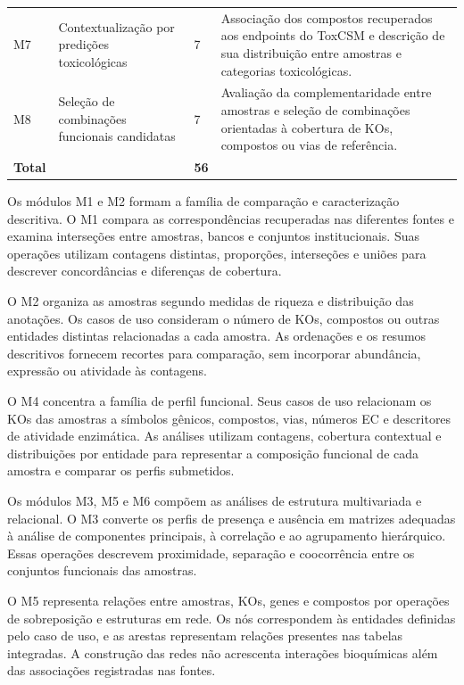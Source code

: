 \begin{table}[htbp]
\begin{tabularx}{\textwidth}{
    @{}
    p{0.75cm}
    p{4.7cm}
    p{0.9cm}
    X
    @{}
}
M7
& Contextualização por predições toxicológicas
& 7
& Associação dos compostos recuperados aos endpoints do ToxCSM e descrição de
sua distribuição entre amostras e categorias toxicológicas. \\

M8
& Seleção de combinações funcionais candidatas
& 7
& Avaliação da complementaridade entre amostras e seleção de combinações
orientadas à cobertura de KOs, compostos ou vias de referência. \\

\midrule
\textbf{Total}
&
& \textbf{56}
& \\

\bottomrule
\end{tabularx}
\end{table}

Os módulos M1 e M2 formam a família de comparação e caracterização
descritiva. O M1 compara as correspondências recuperadas nas diferentes
fontes e examina interseções entre amostras, bancos e conjuntos
institucionais. Suas operações utilizam contagens distintas, proporções,
interseções e uniões para descrever concordâncias e diferenças de cobertura.

O M2 organiza as amostras segundo medidas de riqueza e distribuição das
anotações. Os casos de uso consideram o número de KOs, compostos ou outras
entidades distintas relacionadas a cada amostra. As ordenações e os resumos
descritivos fornecem recortes para comparação, sem incorporar abundância,
expressão ou atividade às contagens.

O M4 concentra a família de perfil funcional. Seus casos de uso relacionam os
KOs das amostras a símbolos gênicos, compostos, vias, números EC e descritores
de atividade enzimática. As análises utilizam contagens, cobertura contextual
e distribuições por entidade para representar a composição funcional de cada
amostra e comparar os perfis submetidos.

Os módulos M3, M5 e M6 compõem as análises de estrutura multivariada e
relacional. O M3 converte os perfis de presença e ausência em matrizes
adequadas à análise de componentes principais, à correlação e ao agrupamento
hierárquico. Essas operações descrevem proximidade, separação e coocorrência
entre os conjuntos funcionais das amostras.

O M5 representa relações entre amostras, KOs, genes e compostos por operações
de sobreposição e estruturas em rede. Os nós correspondem às entidades
definidas pelo caso de uso, e as arestas representam relações presentes nas
tabelas integradas. A construção das redes não acrescenta interações
bioquímicas além das associações registradas nas fontes.


